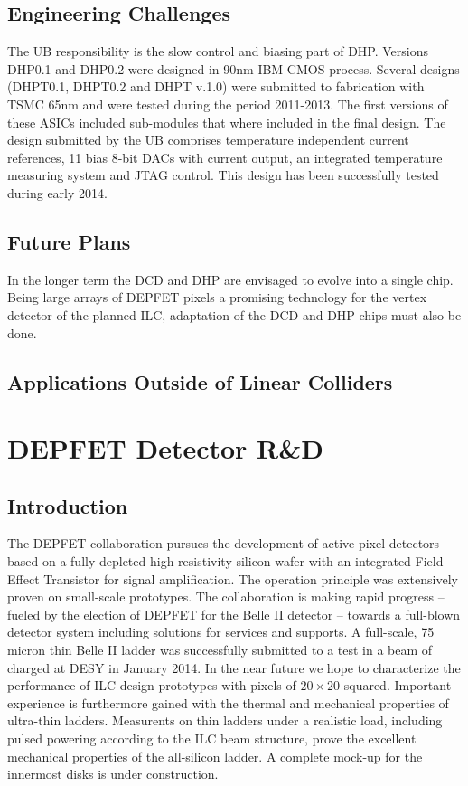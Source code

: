 \subsection{Engineering Challenges}
The UB responsibility is the slow control and biasing part of DHP. Versions DHP0.1 and DHP0.2 were designed in 90nm IBM CMOS process.
Several designs (DHPT0.1, DHPT0.2 and DHPT v.1.0) were submitted to fabrication with TSMC 65nm and were tested during the period 2011-2013. The first versions of these ASICs included sub-modules that where included in the final design. The design submitted by the UB comprises temperature independent current references, 11 bias 8-bit DACs with current output, an integrated temperature measuring system and JTAG control. This design has been successfully tested during early 2014.

\subsection{Future Plans}
In the longer term the DCD and DHP are envisaged to evolve into a single chip. Being large arrays of DEPFET pixels a promising technology for the vertex detector of the planned ILC, adaptation of the DCD and DHP chips must also be done.
\subsection{Applications Outside of Linear Colliders}


\section{DEPFET Detector R\&D}
\subsection{Introduction}
The DEPFET collaboration pursues the development of active pixel detectors based on a fully depleted high-resistivity silicon wafer with an integrated Field Effect Transistor for signal amplification. The operation principle was extensively proven on small-scale prototypes.
The collaboration is making rapid progress -- fueled by the election of DEPFET for the Belle II detector -- towards a full-blown detector system including solutions for services and supports. A full-scale, 75 micron thin Belle II ladder was successfully submitted to a test in a beam of charged at DESY in January 2014. In the near future we hope to characterize the performance of ILC design prototypes with pixels of $20 \times 20$ \micron squared.
Important experience is furthermore gained with the thermal and mechanical properties of ultra-thin ladders. Measurents on thin ladders under a realistic load, including pulsed powering according to the ILC beam structure, prove the excellent mechanical properties of the all-silicon ladder. A complete mock-up for the innermost disks is under construction.

